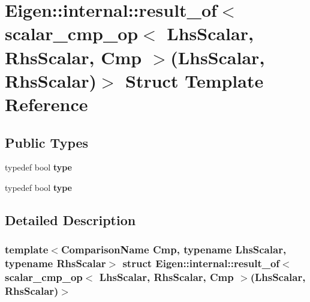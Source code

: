 \hypertarget{struct_eigen_1_1internal_1_1result__of_3_01scalar__cmp__op_3_01_lhs_scalar_00_01_rhs_scalar_00_09c9877449c1099527f34eb0a0f299607}{}\section{Eigen\+:\+:internal\+:\+:result\+\_\+of$<$ scalar\+\_\+cmp\+\_\+op$<$ Lhs\+Scalar, Rhs\+Scalar, Cmp $>$(Lhs\+Scalar, Rhs\+Scalar)$>$ Struct Template Reference}
\label{struct_eigen_1_1internal_1_1result__of_3_01scalar__cmp__op_3_01_lhs_scalar_00_01_rhs_scalar_00_09c9877449c1099527f34eb0a0f299607}
\subsection*{Public Types}
\begin{DoxyCompactItemize}
\item 
\mbox{\label{struct_eigen_1_1internal_1_1result__of_3_01scalar__cmp__op_3_01_lhs_scalar_00_01_rhs_scalar_00_09c9877449c1099527f34eb0a0f299607_ad71776b5f3e55cc1949d292b6c3f9a28}} 
typedef bool {\bfseries type}
\item 
\mbox{\label{struct_eigen_1_1internal_1_1result__of_3_01scalar__cmp__op_3_01_lhs_scalar_00_01_rhs_scalar_00_09c9877449c1099527f34eb0a0f299607_ad71776b5f3e55cc1949d292b6c3f9a28}} 
typedef bool {\bfseries type}
\end{DoxyCompactItemize}


\subsection{Detailed Description}
\subsubsection*{template$<$Comparison\+Name Cmp, typename Lhs\+Scalar, typename Rhs\+Scalar$>$\newline
struct Eigen\+::internal\+::result\+\_\+of$<$ scalar\+\_\+cmp\+\_\+op$<$ Lhs\+Scalar, Rhs\+Scalar, Cmp $>$(\+Lhs\+Scalar, Rhs\+Scalar)$>$}




